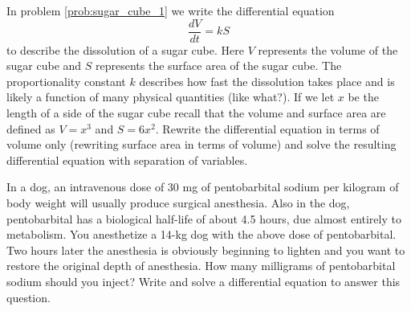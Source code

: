 \begin{problem}
    In problem \ref{prob:sugar_cube_1} we write the differential equation 
    \[ \frac{dV}{dt} = k S \]
    to describe the dissolution of a sugar cube.  Here $V$ represents the volume of the
    sugar cube and $S$ represents the surface area of the sugar cube. The proportionality
    constant $k$ describes how fast the dissolution takes place and is likely a function
    of many physical quantities (like what?).  If we let $x$ be
    the length of a side of the sugar cube recall that the volume and surface area are
    defined as $V = x^3$ and $S = 6x^2$.  Rewrite the differential equation in terms of
    volume only (rewriting surface area in terms of volume) and solve the resulting
    differential equation with separation of variables.
\end{problem}

\begin{problem}
    In a dog, an intravenous dose of 30 mg of pentobarbital sodium per kilogram of body
    weight will usually produce surgical anesthesia. Also in the dog, pentobarbital has a
    biological half-life of about 4.5 hours, due almost entirely to metabolism.  You
    anesthetize a 14-kg dog with the above dose of pentobarbital. Two hours later the
    anesthesia is obviously beginning to lighten and you want to restore the original
    depth of anesthesia. How many milligrams of pentobarbital sodium should you inject?
    Write and solve a differential equation to answer this question.
\end{problem}


